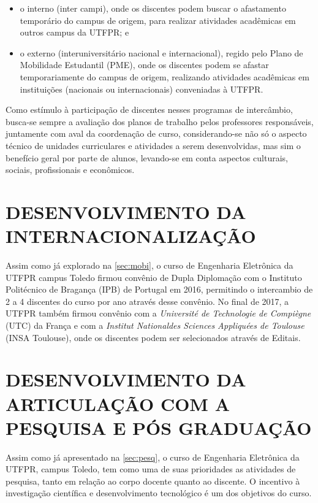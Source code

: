 \begin{itemize}
    \item o interno (inter campi), onde os discentes podem buscar o afastamento temporário do campus de origem, para realizar atividades acadêmicas em outros campus da UTFPR; e
    \item o externo (interuniversitário nacional e internacional), regido pelo Plano de Mobilidade Estudantil (PME), onde os discentes podem se afastar temporariamente do campus de origem, realizando atividades acadêmicas em instituições (nacionais ou internacionais) conveniadas à UTFPR.
\end{itemize}
 
Como estímulo à participação de discentes nesses programas de intercâmbio, busca-se sempre a avaliação dos planos de trabalho pelos professores responsáveis, juntamente com aval da coordenação de curso, considerando-se não só o aspecto técnico de unidades curriculares e atividades a serem desenvolvidas, mas sim o benefício geral por parte de alunos, levando-se em conta aspectos culturais, sociais, profissionais e econômicos.

\section{DESENVOLVIMENTO DA INTERNACIONALIZAÇÃO}

Assim como já explorado na \autoref{sec:mobi}, o curso de Engenharia Eletrônica da UTFPR campus Toledo firmou convênio de Dupla Diplomação com o Instituto Politécnico de Bragança (IPB) de Portugal em 2016, permitindo o intercambio de 2 a 4 discentes do curso por ano através desse convênio. No final de 2017, a UTFPR também firmou convênio com a \textit{Université de Technologie de Compiègne} (UTC) da França e com a \textit{Institut Nationaldes Sciences Appliquées de Toulouse} (INSA Toulouse), onde os discentes podem ser selecionados através de Editais.

\section{DESENVOLVIMENTO DA ARTICULAÇÃO COM A PESQUISA E PÓS GRADUAÇÃO}

Assim como já apresentado na \autoref{sec:pesq}, o curso de Engenharia Eletrônica da UTFPR, campus Toledo, tem como uma de suas prioridades as atividades de pesquisa, tanto em relação ao corpo docente quanto ao discente. O incentivo à investigação científica e desenvolvimento tecnológico é um dos objetivos do curso.

